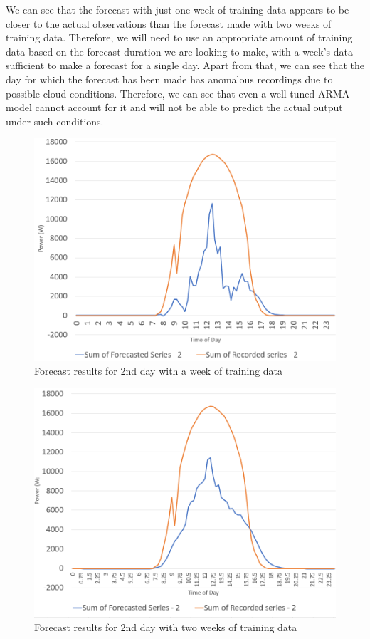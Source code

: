 \documentclass[journal]{IEEEtran}
\begin{document}
We can see that the forecast with just one week of training data appears to be closer to the actual observations than the forecast made with two weeks of training data. Therefore, we will need to use an appropriate amount of training data based on the forecast duration we are looking to make, with a week's data sufficient to make a forecast for a single day.
Apart from that, we can see that the day for which the forecast has been made has anomalous recordings due to possible cloud conditions. Therefore, we can see that even a well-tuned ARMA model cannot account for it and will not be able to predict the actual output under such conditions.

\begin{figure}[htpb]
	\centering
	\includegraphics[scale=0.35]{ForecastOneWeekDayTwo.png}
	\caption{Forecast results for 2nd day with a week of training data}
	\label{fig7} %
\end{figure}

\begin{figure}[htpb]
	\centering
	\includegraphics[scale=0.35]{ForecastTwoWeekDayTwo.png}
	\caption{Forecast results for 2nd day with two weeks of training data}
	\label{fig8} %
\end{figure}
\end{document}
